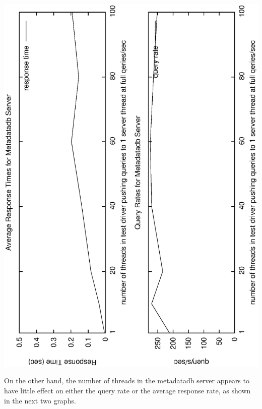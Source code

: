 \documentclass[11pt, a4paper]{article}
\begin{document}
\includegraphics[angle=-90,width=\linewidth]{mdperfthreads.eps}

On the other hand, the number of threads in the metadatadb server appears to have little effect
on either the query rate or the average response rate, as shown in the next two graphs.
\end{document}
